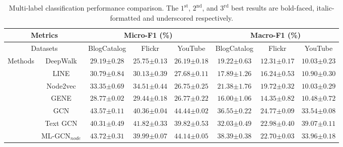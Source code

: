 \documentclass[conference]{IEEEtran}
\begin{document}
\begin{table*}[ht]
\renewcommand{\arraystretch}{1.30}
\centering
\caption{Multi-label classification performance comparison. The $1^{\text{st}}$, $2^{\text{nd}}$, and $3^{\text{rd}}$ best results are bold-faced, italic-formatted and underscored respectively.}
\label{tab:results}
\begin{tabular}{c|c|c|c|c|c|c|c}
\toprule
\multicolumn{2}{c}{Metrics} & \multicolumn{3}{c}{Micro-F1 (\%)} & \multicolumn{3}{c}{Macro-F1 (\%)} \\
\hline
\multicolumn{2}{c|}{Datasets} & BlogCatalog & Flickr & YouTube & BlogCatalog & Flickr & YouTube\\
\hline
\multirow{10}{4em}{Methods} & DeepWalk & {$29.19${\tiny $\pm0.28$}} & {$25.75${\tiny $\pm0.13$}} &   {$26.19${\tiny $\pm0.18$}} & {$19.22${\tiny $\pm0.63$}} & {$12.31${\tiny$\pm0.17$}} &  {$10.03${\tiny$\pm0.23$}} \\

& LINE & {$30.79${\tiny $\pm0.84$}} & {$30.13${\tiny $\pm0.39$}} &   {$27.68${\tiny $\pm0.11$}} & {$17.89${\tiny $\pm1.26$}} & {$16.24${\tiny$\pm0.53$}} &  {$10.90${\tiny$\pm0.30$}} \\

& Node2vec & {$33.35${\tiny $\pm0.69$}} & {$34.51${\tiny $\pm0.44$}} &   {$26.75${\tiny $\pm0.25$}} & {$21.38${\tiny $\pm1.76$}} & {$19.72${\tiny$\pm0.32$}} &  {$10.03${\tiny$\pm0.29$}} \\

& GENE & {$28.77${\tiny $\pm0.02$}} & {$29.44${\tiny $\pm0.18$}} &   {$26.77${\tiny $\pm0.22$}} & {$16.00${\tiny $\pm1.06$}} & {$14.35${\tiny$\pm0.82$}} &  {$10.48${\tiny$\pm0.72$}} \\

& GCN & {$43.57${\tiny $\pm0.11$}} & \underline{{$40.36${\tiny $\pm0.04$}}} &   $\textit{44.44}${\tiny $\pm\textit{0.02}$} & {$36.55${\tiny $\pm0.22$}} & \underline{{$24.77${\tiny$\pm0.09$}}} &  {$33.54${\tiny$\pm0.08$}} \\

& Text GCN & {$40.31${\tiny $\pm0.49$}} & $\textit{41.82}${\tiny $\pm\textit{0.33}$} &   {$39.82${\tiny $\pm0.53$}} & {$32.03${\tiny $\pm0.49$}} & {$22.98${\tiny$\pm0.40$}} &  {$\textit{39.07}${\tiny$\pm\textit{0.11}$}} \\

& ML-GCN$_{node}$ & \underline{{$43.72${\tiny $\pm0.31$}}} & {$39.99${\tiny $\pm0.07$}} & \underline{$44.14${\tiny $\pm0.05$}} & \underline{{$38.39${\tiny $\pm0.38$}}} & {$22.70${\tiny$\pm0.03$}} &  \underline{{$33.96${\tiny$\pm0.18$}}} \\


\end{tabular}
\end{table*}
\end{document}
